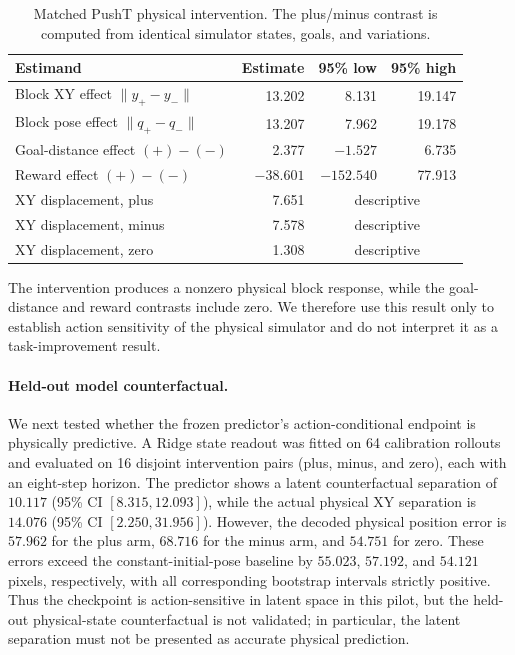 \documentclass{article}
\begin{document}
\begin{table}[H]
\centering
\scriptsize
\caption{Matched PushT physical intervention.  The plus/minus contrast is
computed from identical simulator states, goals, and variations.}
\label{tab:supp-physical-intervention}
\begin{tabular}{lrrr}
\toprule
Estimand & Estimate & 95\% low & 95\% high \\
\midrule
Block XY effect $\|y_{+}-y_{-}\|$ & 13.202 & 8.131 & 19.147 \\
Block pose effect $\|q_{+}-q_{-}\|$ & 13.207 & 7.962 & 19.178 \\
Goal-distance effect $(+)-(-)$ & 2.377 & $-1.527$ & 6.735 \\
Reward effect $(+)-(-)$ & $-38.601$ & $-152.540$ & 77.913 \\
\midrule
XY displacement, plus & 7.651 & \multicolumn{2}{c}{descriptive} \\
XY displacement, minus & 7.578 & \multicolumn{2}{c}{descriptive} \\
XY displacement, zero & 1.308 & \multicolumn{2}{c}{descriptive} \\
\bottomrule
\end{tabular}
\end{table}

The intervention produces a nonzero physical block response, while the
goal-distance and reward contrasts include zero.  We therefore use this result
only to establish action sensitivity of the physical simulator and do not
interpret it as a task-improvement result.

\paragraph{Held-out model counterfactual.}
We next tested whether the frozen predictor's action-conditional endpoint is
physically predictive.  A Ridge state readout was fitted on 64 calibration
rollouts and evaluated on 16 disjoint intervention pairs (plus, minus, and
zero), each with an eight-step horizon.  The predictor shows a latent
counterfactual separation of $10.117$ (95\% CI $[8.315,12.093]$), while the
actual physical XY separation is $14.076$ (95\% CI $[2.250,31.956]$).
However, the decoded physical position error is $57.962$ for the plus arm,
$68.716$ for the minus arm, and $54.751$ for zero.  These errors exceed the
constant-initial-pose baseline by $55.023$, $57.192$, and $54.121$ pixels,
respectively, with all corresponding bootstrap intervals strictly positive.
Thus the checkpoint is action-sensitive in latent space in this pilot, but the
held-out physical-state counterfactual is not validated; in particular, the
latent separation must not be presented as accurate physical prediction.
\end{document}
